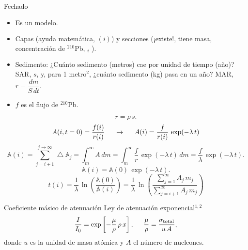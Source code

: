 \documentclass[9pt]{beamer}
\newcommand{\PbCero}{$^{210}$Pb}
\begin{document}
\begin{frame}[noframenumbering, label=Fechado]{Fechado}
\begin{itemize}
\item Es un modelo.
\item Capas (ayuda matemática, $(i)$) y secciones (¡existe!, tiene masa, concentración de \PbCero, $_i$ ).
\item Sedimento: ¿Cuánto sedimento (metros) cae por unidad de tiempo (año)? SAR, $s$, y, para 1 metro$^2$, ¿cuánto sedimento (kg) pasa en un año? MAR, $r = \dfrac{dm}{S\,dt}$.
\item $f$ es el flujo de \PbCero. 
\end{itemize}
 \begin{equation}
r = \rho\,s.
\end{equation}
\begin{equation}
A(i,t=0) = \dfrac{f(i)}{r(i)} \hspace{0.5cm}
\rightarrow \hspace{0.5cm} A(i)	= \dfrac{f}{r(i)}\,\exp(-\lambda\,t) 
\end{equation}
\begin{equation}
\mathbb{A}(i) = \sum_{j=i+1}^{j\rightarrow \infty} \bigtriangleup \mathbb{A}_j = \int_m^\infty A\, dm =  
\int_m^\infty \dfrac{f}{r}\,\exp(-\lambda\,t)\, dm =  \dfrac{f}{\lambda}\,\exp(-\lambda\,t).
\end{equation}
\begin{equation}
\mathbb{A}(i) = \mathbb{A}(0)\,\exp(-\lambda\,t).
\end{equation}
\begin{equation}\label{Eq-Fechado}
t(i) = \dfrac{1}{\lambda}\,\ln\left(\dfrac{\mathbb{A}(0)}{\mathbb{A}(i)}\right) = \dfrac{1}{\lambda}\,\ln\left(\dfrac{\sum_{j=1}^\infty A_j\, m_j}{ \sum_{j=i+1}^\infty A_j\, m_j}\right)
\end{equation}

	\begin{flushright}
	\hyperlink{Portada}{}
	\end{flushright}
\end{frame}

\begin{frame}[noframenumbering, label=Masico]{Coeficiente másico de atenuación}
		 Ley de atenuación exponencial$^{1,2}$
		\begin{equation}
			\dfrac{I}{I_0} = \exp\left[-\dfrac{\mu}{\rho}\,\rho\,x\right], \hspace{0.5cm} \dfrac{\mu}{\rho} = \dfrac{\sigma_\text{total}}{u\,A},
		\end{equation}
		donde $u$ es la unidad de masa atómica y $A$ el número de nucleones.
	\begin{flushright}
	\hyperlink{Portada}{\beamerbutton{Portada}}
	\end{flushright}
\end{frame}
\end{document}
